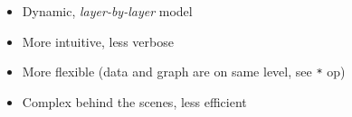 \documentclass[hyperref={pdfpagelabels=false}]{beamer}
\begin{document}
\begin{frame}[fragile]
\begin{columns}[t]
         \centering
         \begin{itemize}[<.->]
         \item \small{Dynamic, \textit{layer-by-layer} model}
         \item \small{More intuitive, less verbose}
         \item \small{More flexible (data and graph are on same level, see \texttt{*} op)}
         \item \small{Complex behind the scenes, less efficient}
         \end{itemize}
       \end{columns}
       
\end{frame}
\end{document}
